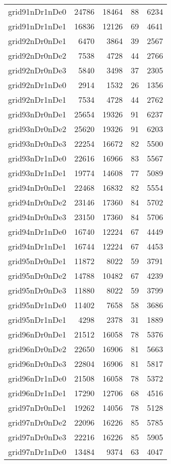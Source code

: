 \begin{tabular}{lrrrr}
grid91nDr1nDe0 & 24786 & 18464 & 88 & 6234 \\
grid91nDr1nDe1 & 16836 & 12126 & 69 & 4641 \\
grid92nDr0nDe1 & 6470 & 3864 & 39 & 2567 \\
grid92nDr0nDe2 & 7538 & 4728 & 44 & 2766 \\
grid92nDr0nDe3 & 5840 & 3498 & 37 & 2305 \\
grid92nDr1nDe0 & 2914 & 1532 & 26 & 1356 \\
grid92nDr1nDe1 & 7534 & 4728 & 44 & 2762 \\
grid93nDr0nDe1 & 25654 & 19326 & 91 & 6237 \\
grid93nDr0nDe2 & 25620 & 19326 & 91 & 6203 \\
grid93nDr0nDe3 & 22254 & 16672 & 82 & 5500 \\
grid93nDr1nDe0 & 22616 & 16966 & 83 & 5567 \\
grid93nDr1nDe1 & 19774 & 14608 & 77 & 5089 \\
grid94nDr0nDe1 & 22468 & 16832 & 82 & 5554 \\
grid94nDr0nDe2 & 23146 & 17360 & 84 & 5702 \\
grid94nDr0nDe3 & 23150 & 17360 & 84 & 5706 \\
grid94nDr1nDe0 & 16740 & 12224 & 67 & 4449 \\
grid94nDr1nDe1 & 16744 & 12224 & 67 & 4453 \\
grid95nDr0nDe1 & 11872 & 8022 & 59 & 3791 \\
grid95nDr0nDe2 & 14788 & 10482 & 67 & 4239 \\
grid95nDr0nDe3 & 11880 & 8022 & 59 & 3799 \\
grid95nDr1nDe0 & 11402 & 7658 & 58 & 3686 \\
grid95nDr1nDe1 & 4298 & 2378 & 31 & 1889 \\
grid96nDr0nDe1 & 21512 & 16058 & 78 & 5376 \\
grid96nDr0nDe2 & 22650 & 16906 & 81 & 5663 \\
grid96nDr0nDe3 & 22804 & 16906 & 81 & 5817 \\
grid96nDr1nDe0 & 21508 & 16058 & 78 & 5372 \\
grid96nDr1nDe1 & 17290 & 12706 & 68 & 4516 \\
grid97nDr0nDe1 & 19262 & 14056 & 78 & 5128 \\
grid97nDr0nDe2 & 22096 & 16226 & 85 & 5785 \\
grid97nDr0nDe3 & 22216 & 16226 & 85 & 5905 \\
grid97nDr1nDe0 & 13484 & 9374 & 63 & 4047 \\

\end{tabular}
